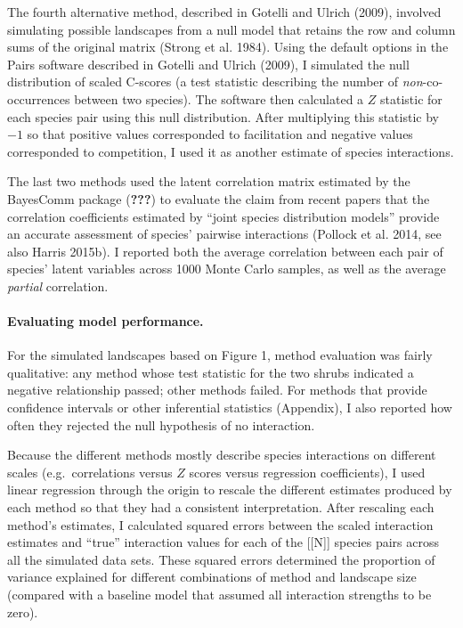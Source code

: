 \documentclass[12pt,]{article}
\begin{document}
\begin{spacing}{1.9}
\begin{flushleft}
The fourth alternative method, described in Gotelli and Ulrich (2009),
involved simulating possible landscapes from a null model that retains
the row and column sums of the original matrix (Strong et al. 1984).
Using the default options in the Pairs software described in Gotelli and
Ulrich (2009), I simulated the null distribution of scaled C-scores (a
test statistic describing the number of \emph{non}-co-occurrences
between two species). The software then calculated a \(Z\) statistic for
each species pair using this null distribution. After multiplying this
statistic by \(-1\) so that positive values corresponded to facilitation
and negative values corresponded to competition, I used it as another
estimate of species interactions.

The last two methods used the latent correlation matrix estimated by the
BayesComm package ({\textbf{???}}) to evaluate the claim from recent
papers that the correlation coefficients estimated by ``joint species
distribution models'' provide an accurate assessment of species'
pairwise interactions (Pollock et al. 2014, see also Harris 2015b). I
reported both the average correlation between each pair of species'
latent variables across 1000 Monte Carlo samples, as well as the average
\emph{partial} correlation.

\paragraph{Evaluating model
performance.}\label{evaluating-model-performance.}

For the simulated landscapes based on Figure 1, method evaluation was
fairly qualitative: any method whose test statistic for the two shrubs
indicated a negative relationship passed; other methods failed. For
methods that provide confidence intervals or other inferential
statistics (Appendix), I also reported how often they rejected the null
hypothesis of no interaction.

Because the different methods mostly describe species interactions on
different scales (e.g.~correlations versus \(Z\) scores versus
regression coefficients), I used linear regression through the origin to
rescale the different estimates produced by each method so that they had
a consistent interpretation. After rescaling each method's estimates, I
calculated squared errors between the scaled interaction estimates and
``true'' interaction values for each of the {[}{[}N{]}{]} species pairs
across all the simulated data sets. These squared errors determined the
proportion of variance explained for different combinations of method
and landscape size (compared with a baseline model that assumed all
interaction strengths to be zero).


\end{flushleft}
\end{spacing}
\end{document}
